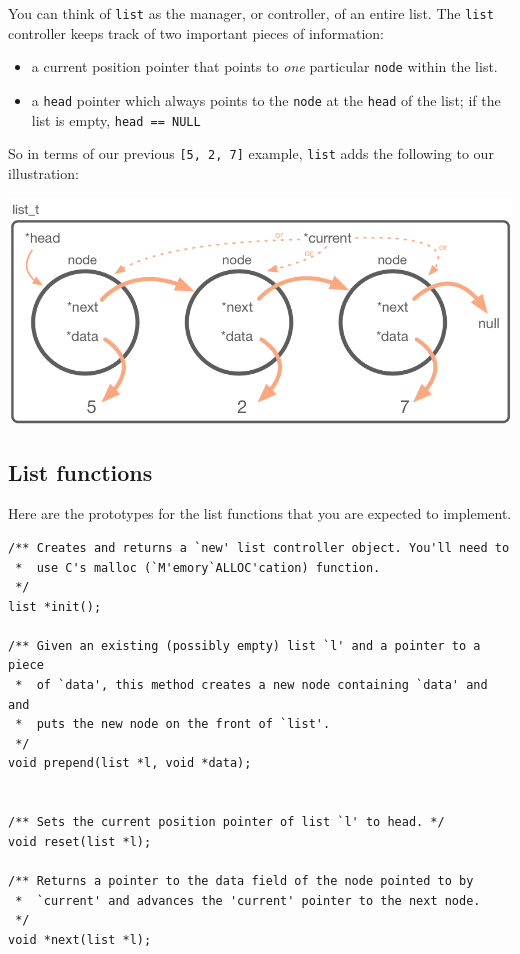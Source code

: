 \documentclass[12pt]{article}
\begin{document}
\noindent You can think of \texttt{list} as the manager, or controller, of an entire list. The \texttt{list} controller keeps track of two important pieces of information:
\begin{itemize}
\item a current position pointer that points to \textit{one} particular \texttt{node} within the list.
\item a \texttt{head} pointer which always points to the \texttt{node} at the \texttt{head} of the list; if the list is empty, \texttt{head == NULL}
\end{itemize}

\noindent So in terms of our previous \texttt{[5, 2, 7]} example, \texttt{list} adds the following to our illustration:

\begin{center}
\includegraphics[scale=0.60]{figures/node_diag2.png}
\end{center}

\subsection{List functions}

Here are the prototypes for the list functions that you are expected to implement. 

\begin{mdframed}[backgroundcolor=light-gray, innerleftmargin=10, innertopmargin=1,innerbottommargin=1,linecolor=light-gray]
\begin{lstlisting}
/** Creates and returns a `new' list controller object. You'll need to 
 *  use C's malloc (`M'emory`ALLOC'cation) function.
 */
list *init();

/** Given an existing (possibly empty) list `l' and a pointer to a piece 
 *  of `data', this method creates a new node containing `data' and and 
 *  puts the new node on the front of `list'.
 */
void prepend(list *l, void *data);


/** Sets the current position pointer of list `l' to head. */
void reset(list *l);

/** Returns a pointer to the data field of the node pointed to by 
 *  `current' and advances the 'current' pointer to the next node.
 */
void *next(list *l);
\end{lstlisting}
\end{mdframed}
\end{document}
